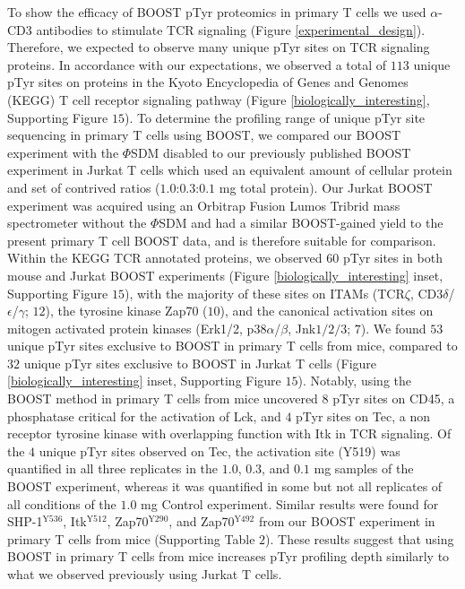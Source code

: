 \documentclass[journal=jprobs,manuscript=article]{achemso}
\begin{document}
To show the efficacy of BOOST pTyr proteomics in primary T cells we used $\alpha$-CD3 antibodies to stimulate TCR signaling (Figure \ref{experimental_design}). Therefore, we expected to observe many unique pTyr sites on TCR signaling proteins. In accordance with our expectations, we observed a total of $113$ unique pTyr sites on proteins in the Kyoto Encyclopedia of Genes and Genomes (KEGG) T cell receptor signaling pathway (Figure \ref{biologically_interesting}, Supporting Figure $15$). To determine the profiling range of unique pTyr site sequencing in primary T cells using BOOST, we compared our BOOST experiment with the $\Phi$SDM disabled to our previously published BOOST experiment in Jurkat T cells which used an equivalent amount of cellular protein and set of contrived ratios ($1.0$:$0.3$:$0.1$ mg total protein)\cite{chua2020tandem}. Our Jurkat BOOST experiment was acquired using an Orbitrap Fusion Lumos Tribrid mass spectrometer without the $\Phi$SDM and had a similar BOOST-gained yield to the present primary T cell BOOST data\cite{yu2020benchmarking,chua2020tandem}, and is therefore suitable for comparison. Within the KEGG TCR annotated proteins, we observed $60$ pTyr sites in both mouse and Jurkat BOOST experiments (Figure \ref{biologically_interesting} inset, Supporting Figure $15$), with the majority of these sites on ITAMs (TCR$\zeta$, CD3$\delta$/$\epsilon$/$\gamma$; $12$), the tyrosine kinase Zap70 ($10$), and the canonical activation sites on mitogen activated protein kinases (Erk1/2, p38$\alpha$/$\beta$, Jnk$1/2/3$; $7$). We found $53$ unique pTyr sites exclusive to BOOST in primary T cells from mice, compared to $32$ unique pTyr sites exclusive to BOOST in Jurkat T cells (Figure \ref{biologically_interesting} inset, Supporting Figure $15$). Notably, using the BOOST method in primary T cells from mice uncovered $8$ pTyr sites on CD45, a phosphatase critical for the activation of Lck\cite{sieh1993cd45}, and $4$ pTyr sites on Tec, a non receptor tyrosine kinase with overlapping function with Itk in TCR signaling\cite{yang1999role,aoki2004mutual}. Of the $4$ unique pTyr sites observed on Tec, the activation site (Y519) was quantified in all three replicates in the $1.0$, $0.3$, and $0.1$ mg samples of the BOOST experiment, whereas it was quantified in some but not all replicates of all conditions of the $1.0$ mg Control experiment. Similar results were found for SHP-1$^{\text{Y536}}$, Itk$^{\text{Y512}}$, Zap70$^{\text{Y290}}$, and Zap70$^{\text{Y492}}$ from our BOOST experiment in primary T cells from mice (Supporting Table $2$). These results suggest that using BOOST in primary T cells from mice increases pTyr profiling depth similarly to what we observed previously using Jurkat T cells\cite{chua2020tandem,chua2021ovalbumin}.
\end{document}
